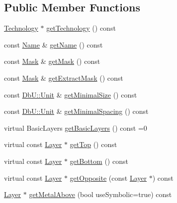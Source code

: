 \subsection*{Public Member Functions}
\begin{DoxyCompactItemize}
\item 
\hyperlink{classHurricane_1_1Technology}{Technology} $\ast$ \hyperlink{classHurricane_1_1Layer_ae506b17bd7a245de622f8a8e9947629b}{get\+Technology} () const
\item 
const \hyperlink{classHurricane_1_1Name}{Name} \& \hyperlink{classHurricane_1_1Layer_a3dc54f6efc60fddb8529599caa6b0f1f}{get\+Name} () const
\item 
const \hyperlink{classHurricane_1_1Layer_af5277c670637bd5d910237e7afe01a91}{Mask} \& \hyperlink{classHurricane_1_1Layer_a29b22c3b59cc24bf82449ad6c068ff1f}{get\+Mask} () const
\item 
const \hyperlink{classHurricane_1_1Layer_af5277c670637bd5d910237e7afe01a91}{Mask} \& \hyperlink{classHurricane_1_1Layer_af009bbd89a8e8260122b7244bfa10349}{get\+Extract\+Mask} () const
\item 
const \hyperlink{group__DbUGroup_ga4fbfa3e8c89347af76c9628ea06c4146}{Db\+U\+::\+Unit} \& \hyperlink{classHurricane_1_1Layer_afed9a488bf20daaeed18874f2b16268e}{get\+Minimal\+Size} () const
\item 
const \hyperlink{group__DbUGroup_ga4fbfa3e8c89347af76c9628ea06c4146}{Db\+U\+::\+Unit} \& \hyperlink{classHurricane_1_1Layer_a6a03f9f40ca855d33763497162414062}{get\+Minimal\+Spacing} () const
\item 
virtual Basic\+Layers \hyperlink{classHurricane_1_1Layer_a7e953c126a02952e3a0b0d32f37e2ae0}{get\+Basic\+Layers} () const =0
\item 
virtual const \hyperlink{classHurricane_1_1Layer}{Layer} $\ast$ \hyperlink{classHurricane_1_1Layer_a5f7c43a29f3dd02a9ebccbcbf91d6727}{get\+Top} () const
\item 
virtual const \hyperlink{classHurricane_1_1Layer}{Layer} $\ast$ \hyperlink{classHurricane_1_1Layer_a4dab4552a219d2d900ed0b1245dc6580}{get\+Bottom} () const
\item 
virtual const \hyperlink{classHurricane_1_1Layer}{Layer} $\ast$ \hyperlink{classHurricane_1_1Layer_a69e76c09a56260169c4f5c145a35a47f}{get\+Opposite} (const \hyperlink{classHurricane_1_1Layer}{Layer} $\ast$) const
\item 
\hyperlink{classHurricane_1_1Layer}{Layer} $\ast$ \hyperlink{classHurricane_1_1Layer_ac32eff2dc51180660fe9b4ce17cae42c}{get\+Metal\+Above} (bool use\+Symbolic=true) const

\end{DoxyCompactItemize}
